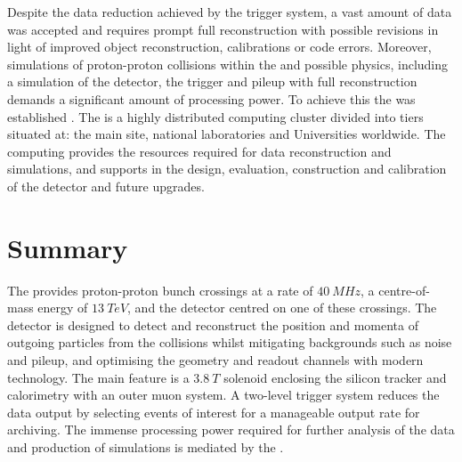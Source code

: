 Despite the data reduction achieved by the \CMS trigger system, a vast amount
of data was accepted and requires prompt full reconstruction with possible
revisions in light of improved object reconstruction, calibrations or code
errors. Moreover, simulations of proton-proton collisions within the \SM and
possible \BSM physics, including a simulation of the detector, the trigger and
pileup with full reconstruction demands a significant amount of processing
power. To achieve this the \WLCG was established \cite{Bird:1695401}. The
\WLCG is a highly distributed computing cluster divided into tiers situated
at: the main \CERN site, national laboratories and Universities worldwide. The
computing  provides the resources required for data reconstruction and
simulations, and supports in the design, evaluation, construction and
calibration of the detector and future upgrades.


\section{Summary}

The \LHC provides proton-proton bunch crossings at a rate of ${\SI{40}{MHz}}$,
a centre-of-mass energy of ${\SI{13}{TeV}}$, and the \CMS detector centred on
one of these crossings. The \CMS detector is designed to detect and
reconstruct the position and momenta of outgoing particles from the collisions
whilst mitigating backgrounds such as noise and pileup, and optimising the
geometry and readout channels with modern technology. The main feature is a
${\SI{3.8}{T}}$ solenoid enclosing the silicon tracker and calorimetry with an
outer muon system. A two-level trigger system reduces the data output by
selecting events of interest for a manageable output rate for archiving.
The immense processing power required for further analysis of the data and
production of simulations is mediated by the \WLCG.